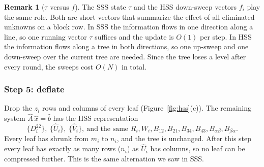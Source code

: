 \documentclass[11pt]{article}
\newcommand{\hU}{\widehat U}
\newcommand{\hV}{\widehat V}
\newcommand{\hx}{\hat x}
\newcommand{\hb}{\hat b}
\theoremstyle{definition}
\newtheorem{remark}{Remark}
\begin{document}
\begin{remark}[$\tau$ versus $f$]
The SSS state $\tau$ and the HSS down-sweep vectors $f_i$ play the same role.
Both are short vectors that summarize the effect of all eliminated unknowns
on a block row. In SSS the information flows in one direction along a line,
so one running vector $\tau$ suffices and the update is $O(1)$ per step. In HSS
the information flows along a tree in both directions, so one up-sweep and one
down-sweep over the current tree are needed. Since the tree loses a level
after every round, the sweeps cost $O(N)$ in total.
\end{remark}

\subsubsection*{Step 5: deflate}

Drop the $z_i$ rows and columns of every leaf
(Figure~\ref{fig:hss}(c)). The remaining system
$\widehat A\,\hx = \hb$ has the HSS representation
\[
\{D_i^{22}\},\ \{\hU_i\},\ \{\hV_i\},\ \text{and the same } R_i,W_i,B_{12},B_{21},B_{34},B_{43},B_{\alpha\beta},B_{\beta\alpha}.
\]
Every leaf has shrunk from $m_i$ to $n_i$, and the tree is unchanged.
After this step every leaf has exactly as many rows ($n_i$) as $\hU_i$ has
columns, so no leaf can be compressed further. This is the same alternation
we saw in SSS.
\end{document}
